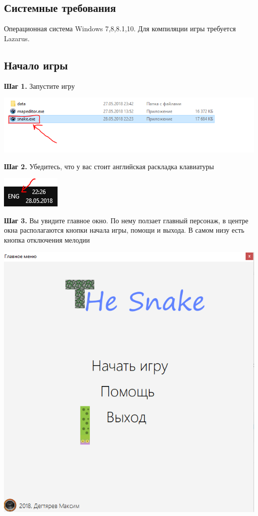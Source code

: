 \documentclass[a4paper,14pt]{extarticle}
\begin{document}
\subsection{Системные требования}
Операционная система Windows 7,8,8.1,10. Для компиляции игры требуется Lazarus.
\subsection{Начало игры}
\textbf{Шаг 1.} Запустите игру
\begin{center}
\includegraphics[scale=.9]{img2-1}
\end{center}

\textbf{Шаг 2.} Убедитесь, что у вас стоит английская раскладка клавиатуры
\begin{center}
\includegraphics[scale=.9]{2-2}
\end{center}

\textbf{Шаг 3.} Вы увидите главное окно. По нему ползает главный персонаж, в центре окна располагаются кнопки начала игры, помощи и выхода. В самом низу есть кнопка отключения мелодии
\begin{center}
\includegraphics[scale=.9]{img2}
\end{center}
\end{document}
